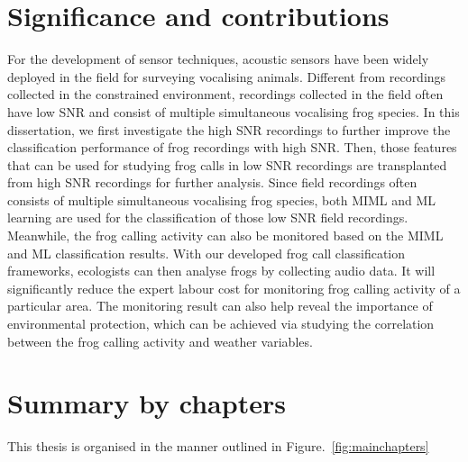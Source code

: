  
 
\section{Significance and contributions}
For the development of sensor techniques, acoustic sensors have been widely deployed in the field for surveying vocalising animals. Different from recordings collected in the constrained environment, recordings collected in the field often have low SNR and consist of multiple simultaneous vocalising frog species. In this dissertation, we first investigate the high SNR recordings to further improve the classification performance of frog recordings with high SNR. 
Then, those features that can be used for studying frog calls in low SNR recordings are transplanted from high SNR recordings for further analysis.
Since field recordings often consists of multiple simultaneous vocalising frog species, both MIML and ML learning are used for the classification of those low SNR field recordings. Meanwhile, the frog calling activity can also be monitored based on the MIML and ML classification results.
With our developed frog call classification frameworks, ecologists can then analyse frogs by collecting audio data. It will significantly reduce the expert labour cost for monitoring frog calling activity of a particular area. The monitoring result can also help reveal the importance of environmental protection, which can be achieved via studying the correlation between the frog calling activity and weather variables. 

 
 
\section{Summary by chapters} 
 
This thesis is organised in the manner outlined in Figure.~\ref{fig:mainchapters}

